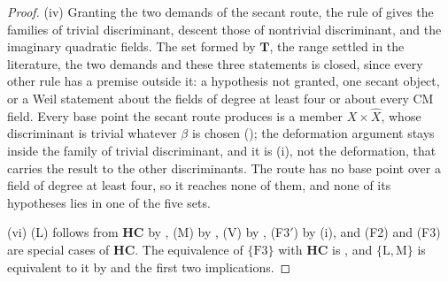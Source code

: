 \begin{proof}
(iv) Granting the two demands of the secant route, the rule of
\cite[Proposition~15.19]{paperI} gives the families of trivial discriminant, descent
those of nontrivial discriminant, and  the imaginary
quadratic fields. The set formed by $\mathbf{T}$, the range settled in the
literature, the two demands and these three statements is closed, since
every other rule has a premise outside it: a hypothesis not granted, one
secant object, or a Weil statement about the fields of degree at least four
or about every CM field. Every base point the secant route produces is a
member $X\times\widehat{X}$, whose discriminant is trivial whatever $\beta$
is chosen (\cite[Proposition~15.19(ii)]{paperI}); the deformation argument stays inside
the family of trivial discriminant, and it is (i), not
the deformation, that carries the result to the other discriminants. The
route has no base point over a field of degree at least four, so it reaches
none of them, and none of its hypotheses lies in one of the five sets.

(vi) \textup{(L)} follows from $\mathbf{HC}$ by \cite[Theorem~12.2]{paperI},
\textup{(M)} by , \textup{(V)} by ,
(F3$'$) by (i), and (F2) and (F3) are special cases of
$\mathbf{HC}$. The equivalence of $\{\mathrm{F3}\}$ with $\mathbf{HC}$ is
, and $\{\mathrm{L},\mathrm{M}\}$ is equivalent to it by
 and the first two implications.
\end{proof}

